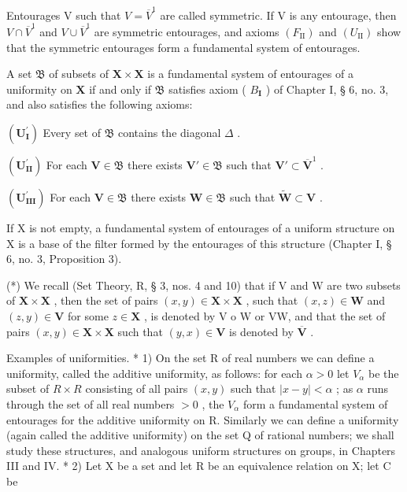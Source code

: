 Entourages V such that \(V = \overline{V}^{1}\) are called symmetric. If V is any entourage, then \(V \cap \overline{V}^{1}\) and \(V \cup \overline{V}^{1}\) are symmetric entourages, and axioms \((F_{\mathrm{II}})\) and \((U_{\mathrm{II}})\) show that the symmetric entourages form a fundamental system of entourages.

A set \(\mathfrak{B}\) of subsets of \(\mathbf{X} \times \mathbf{X}\) is a fundamental system of entourages of a uniformity on \(\mathbf{X}\) if and only if \(\mathfrak{B}\) satisfies axiom ( \(B_{\mathbf{I}}\) ) of Chapter I, § 6, no. 3, and also satisfies the following axioms:

\((\mathbf{U}_{\mathbf{I}}^{\prime})\) Every set of \(\mathfrak{B}\) contains the diagonal \(\Delta\) .

\((\mathbf{U}_{\mathbf{II}}^{\prime})\) For each \(\mathbf{V} \in \mathfrak{B}\) there exists \(\mathbf{V}' \in \mathfrak{B}\) such that \(\mathbf{V}' \subset \overline{\mathbf{V}}^1\) .

\((\mathbf{U}_{\mathbf{III}}^{\prime})\) For each \(\mathbf{V} \in \mathfrak{B}\) there exists \(\mathbf{W} \in \mathfrak{B}\) such that \(\tilde{\mathbf{W}} \subset \mathbf{V}\) .

If X is not empty, a fundamental system of entourages of a uniform structure on X is a base of the filter formed by the entourages of this structure (Chapter I, § 6, no. 3, Proposition 3).

(*) We recall (Set Theory, R, § 3, nos. 4 and 10) that if V and W are two subsets of \(\mathbf{X} \times \mathbf{X}\) , then the set of pairs \((x, y) \in \mathbf{X} \times \mathbf{X}\) , such that \((x, z) \in \mathbf{W}\) and \((z, y) \in \mathbf{V}\) for some \(z \in \mathbf{X}\) , is denoted by V o W or VW, and that the set of pairs \((x, y) \in \mathbf{X} \times \mathbf{X}\) such that \((y, x) \in \mathbf{V}\) is denoted by \(\overline{\mathbf{V}}\) .

Examples of uniformities. * 1) On the set R of real numbers we can define a uniformity, called the additive uniformity, as follows: for each \(\alpha > 0\) let \(V_{\alpha}\) be the subset of \(R \times R\) consisting of all pairs \((x, y)\) such that \(|x - y| < \alpha\) ; as \(\alpha\) runs through the set of all real numbers \(> 0\) , the \(V_{\alpha}\) form a fundamental system of entourages for the additive uniformity on R. Similarly we can define a uniformity (again called the additive uniformity) on the set Q of rational numbers; we shall study these structures, and analogous uniform structures on groups, in Chapters III and IV. * 2) Let X be a set and let R be an equivalence relation on X; let C be

